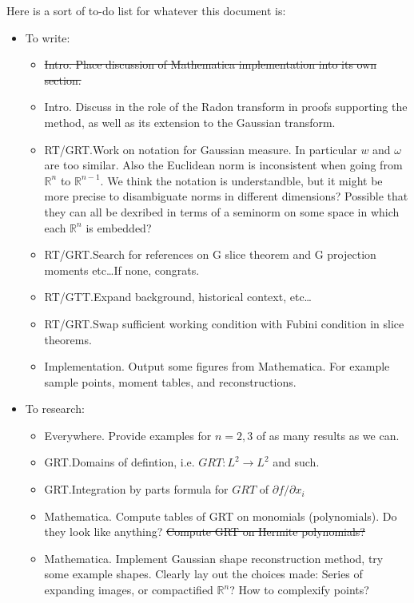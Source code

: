 \documentclass{amsart}
\theoremstyle{remark}
\numberwithin{equation}{section}
\newcommand{\RR}{\mathbb{R}}
\begin{document}
Here is a sort of to-do list for whatever this document is:
\begin{itemize}
\item To write:
\begin{itemize}
\item \sout{Intro. Place discussion of Mathematica implementation into its own section.}
\item Intro. Discuss in the role of the Radon transform in proofs supporting the method, as well as its extension to the Gaussian transform.
\item RT/GRT.\@ Work on notation for Gaussian measure. In particular $w$ and $\omega$ are too similar. Also the Euclidean norm is inconsistent when going from $\RR^n$ to $\RR^{n-1}$. We think the notation is understandble, but it might be more precise to disambiguate norms in different dimensions? Possible that they can all be dexribed in terms of a seminorm on some space in which each $\RR^n$ is embedded? 
\item RT/GRT.\@ Search for references on G slice theorem and G projection moments etc\ldots If none, congrats.
\item RT/GTT.\@ Expand background, historical context, etc\ldots
\item RT/GRT.\@ Swap sufficient working condition with Fubini condition in slice theorems.
\item Implementation. Output some figures from Mathematica. For example sample points, moment tables, and reconstructions.
\end{itemize}

\item To research:
\begin{itemize}
\item Everywhere. Provide examples for $n = 2, 3$ of as many results as we can.
\item GRT.\@ Domains of defintion, i.e. $GRT: L^2 \rightarrow L^2$ and such.
\item GRT.\@ Integration by parts formula for $GRT$ of $\partial f/\partial x_i$
\item Mathematica. Compute tables of GRT on monomials (polynomials). Do they look like anything? \sout{Compute GRT on Hermite polynomials?}
\item Mathematica. Implement Gaussian shape reconstruction method, try some example shapes. Clearly lay out the choices made: Series of expanding images, or compactified $\RR^n$? How to complexify points?
\end{itemize}
\end{itemize}
\end{document}

